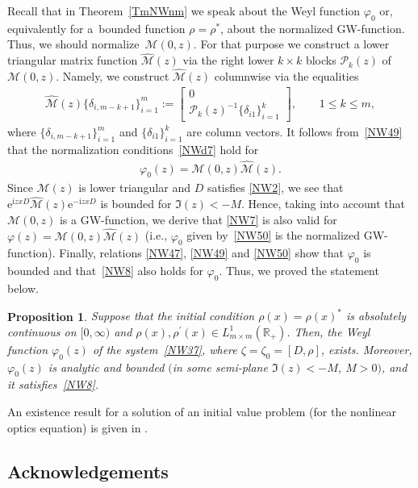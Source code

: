 \documentclass[pdftex]{sigma}
\newtheorem{Proposition}[Theorem]{Proposition}
{\theoremstyle{definition}
\newtheorem{Definition}[Theorem]{Definition}
\newtheorem{Notation}[Theorem]{Notation}
\newtheorem{Example}[Theorem]{Example}
\newtheorem{Remark}[Theorem]{Remark}
}
\def\vp{\varphi}
\def\wh{\widehat}
\def\BR{{\mathbb R}}
\newcommand{\E}{\mathrm{e}}
\newcommand{\I}{\mathrm{i}}
\newcommand{\cM}{{\mathcal M}}
\newcommand{\cP}{{\mathcal P}}
\numberwithin{equation}{section}
\begin{document}
Recall that in Theorem~\ref{TmNWnm} we speak about the Weyl function $\vp_0$ or, equivalently for a~boun\-ded function $\rho=\rho^*$,
about the normalized GW-function. Thus, we should normali\-ze~$\cM(0,z)$. For that purpose we construct a lower triangular
matrix function $\wh \cM(z)$ via the right lower $k\times k$ blocks $\cP_k(z)$ of $\cM(0,z)$. Namely, we construct
$\wh \cM(z)$ columnwise via the equalities
\begin{gather}
\wh \cM(z)\{\delta_{i,m-k+1}\}_{i=1}^m:=\begin{bmatrix}
0 \\ \cP_k(z)^{-1}\{\delta_{i1}\}_{i=1}^k
\end{bmatrix}, \qquad 1\leq k \leq m ,
 \label{NW49}
\end{gather}
where $\{\delta_{i,m-k+1}\}_{i=1}^m$ and $\{\delta_{i1}\}_{i=1}^k$ are column vectors.
It follows from~\eqref{NW49} that the normalization conditions~\eqref{NWd7} hold for
\begin{gather}
\vp_0(z)=\cM(0,z)\wh \cM(z).
 \label{NW50}
\end{gather}
Since $\cM(z)$ is lower triangular and $D$ satisf\/ies \eqref{NW2}, we see that $\E^{\I z x D}\wh \cM(z) \E^{-\I z x D}$ is bounded
for $\Im(z)<-M$. Hence, taking into account that $\cM(0,z)$ is a GW-function, we derive
that \eqref{NW7} is also valid for $\vp(z)=\cM(0,z)\wh \cM(z)$ (i.e., $\vp_0$ given by~\eqref{NW50} is the normalized GW-function).
Finally, relations \eqref{NW47}, \eqref{NW49} and \eqref{NW50} show that $\vp_0$ is bounded and that~\eqref{NW8} also holds
for $\vp_0$. Thus, we proved the statement below.
\begin{Proposition} \label{NWPnNorm} Suppose that the initial condition $\rho(x)=\rho(x)^*$ is absolutely continuous on $[0, \infty)$
and $\rho(x), \rho^{\prime}(x)\in
L^1_{m\times m}(\BR_+)$. Then, the Weyl function $\vp_0(z)$ of the system~\eqref{NW37}, where $\zeta=\zeta_0=[D,\rho]$, exists. Moreover, $\vp_0(z)$ is
analytic and bounded $($in some semi-plane $\Im(z)<-M$, $M>0)$, and it satisfies~\eqref{NW8}.
\end{Proposition}

An existence result for a solution of an initial value problem (for the nonlinear optics equation)
is given in \cite[Remark~4.7]{SaA17}.


\subsection*{Acknowledgements}
\end{document}

